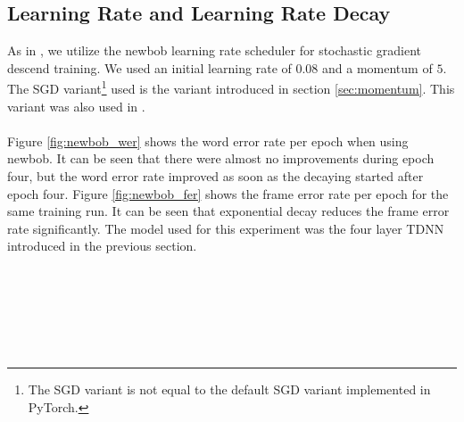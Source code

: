 \subsection{Learning Rate and Learning Rate Decay}
As in \cite{nguyen20162016}, we utilize the newbob learning rate scheduler for stochastic gradient descend training. We used an initial learning rate of $0.08$ and a momentum of $5$. The SGD variant\footnote{The SGD variant is not equal to the default SGD variant implemented in PyTorch.} used is the variant introduced in section \ref{sec:momentum}. This variant was also used in  \cite{nguyen20162016}.
\\ \\
Figure \ref{fig:newbob_wer} shows the word error rate per epoch when using newbob. It can be seen that there were almost no improvements during epoch four, but the word error rate improved as soon as the decaying started after epoch four. Figure \ref{fig:newbob_fer} shows the frame error rate per epoch for the same training run. It can be seen that exponential decay reduces the frame error rate significantly. The model used for this experiment was the four layer TDNN introduced in the previous section. \\ \\
\begin{minipage}{\linewidth}
	\label{fig:newbob_wer}
\end{minipage}
 \\ \\ \\ \\ 
